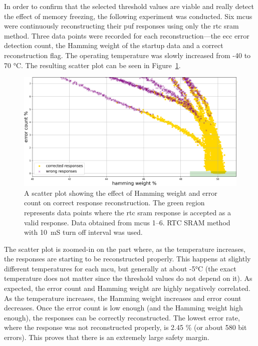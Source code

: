 In order to confirm that the selected threshold values are viable and really detect the effect of memory freezing, the following experiment was conducted. Six \glspl{mcu} were continuously reconstructing their \gls{puf} responses using only the \gls{rtc} \gls{sram} method. Three data points were recorded for each reconstruction---the \gls{ecc} error detection count, the Hamming weight of the startup data and a correct reconstruction flag. The operating temperature was slowly increased from -40 to 70 °C. The resulting scatter plot can be seen in Figure~\ref{fig:correct_responses_plot}.

\begin{figure}[ht!]
    \centering
    \captionsetup{margin=0.5cm}
    \includegraphics[width=\textwidth]{images/correct_responses_plot.png}
    \caption[A scatter plot showing the effect of Hamming weight and error count on correct response reconstruction]{A scatter plot showing the effect of Hamming weight and error count on correct response reconstruction. The green region represents data points where the \gls{rtc} \gls{sram} response is accepted as a valid response. Data obtained from \glspl{mcu} 1--6. RTC SRAM method with 10~mS turn off interval was used.}
    \label{fig:correct_responses_plot}
\end{figure}

The scatter plot is zoomed-in on the part where, as the temperature increases, the responses are starting to be reconstructed properly. This happens at slightly different temperatures for each \gls{mcu}, but generally at about -5°C (the exact temperature does not matter since the threshold values do not depend on it). As expected, the error count and Hamming weight are highly negatively correlated. As the temperature increases, the Hamming weight increases and error count decreases. Once the error count is low enough (and the Hamming weight high enough), the responses can be correctly reconstructed. The lowest error rate, where the response was not reconstructed properly, is 2.45 \% (or about 580 bit errors). This proves that there is an extremely large safety margin.

